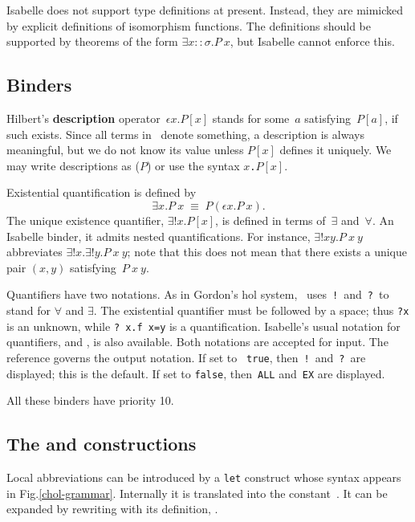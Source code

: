 Isabelle does not support type definitions at present.  Instead, they are
mimicked by explicit definitions of isomorphism functions.  The definitions
should be supported by theorems of the form $\exists x::\sigma.P~x$, but
Isabelle cannot enforce this.


\subsection{Binders}
Hilbert's {\bf description} operator~$\epsilon x.P[x]$ stands for some~$a$
satisfying~$P[a]$, if such exists.  Since all terms in \CHOL\ denote
something, a description is always meaningful, but we do not know its value
unless $P[x]$ defines it uniquely.  We may write descriptions as
($P$) or use the syntax
\hbox{\tt \at $x$.$P[x]$}.

Existential quantification is defined by
\[ \exists x.P~x \;\equiv\; P(\epsilon x.P~x). \]
The unique existence quantifier, $\exists!x.P[x]$, is defined in terms
of~$\exists$ and~$\forall$.  An Isabelle binder, it admits nested
quantifications.  For instance, $\exists!x y.P~x~y$ abbreviates
$\exists!x. \exists!y.P~x~y$; note that this does not mean that there
exists a unique pair $(x,y)$ satisfying~$P~x~y$.

Quantifiers have two notations.  As in Gordon's {\sc hol} system, \CHOL\
uses~{\tt!}\ and~{\tt?}\ to stand for $\forall$ and $\exists$.  The
existential quantifier must be followed by a space; thus {\tt?x} is an
unknown, while \verb'? x.f x=y' is a quantification.  Isabelle's usual
notation for quantifiers, \sdx{ALL} and \sdx{EX}, is also
available.  Both notations are accepted for input.  The {\ML} reference
\ttindexbold{HOL_quantifiers} governs the output notation.  If set to {\tt
true}, then~{\tt!}\ and~{\tt?}\ are displayed; this is the default.  If set
to {\tt false}, then~{\tt ALL} and~{\tt EX} are displayed.

All these binders have priority 10. 


\subsection{The  and  constructions}
Local abbreviations can be introduced by a {\tt let} construct whose
syntax appears in Fig.\ts\ref{chol-grammar}.  Internally it is translated into
the constant~\cdx{Let}.  It can be expanded by rewriting with its
definition, \tdx{Let_def}.

